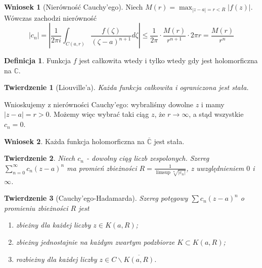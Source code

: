 \documentclass[11pt]{article}
\newcommand{\abs}[1]{\left|#1\right|} %
\newcommand{\closure}[1]{\overline{#1}} %
\newcommand{\extcomplex}{\overline{\mathbb{C}}} %
\theoremstyle{plain}
\newtheorem*{theorem}{Twierdzenie}
\theoremstyle{definition}
\newtheorem*{definition}{Definicja}
\newtheorem*{corollary}{Wniosek}
\theoremstyle{remark}
\let\oldendproof\endproof
\renewenvironment{proof}[1][\proofname]{
  \oldproof[\textsc{\small #1}]
}{\oldendproof}
\begin{document}
\begin{corollary}[Nierówność Cauchy'ego]
  Niech $ M(r) = \max_{\abs{z-a} = r < R} \abs{f(z)} $. Wówczas zachodzi nierówność
  $$ \abs{c_{n}} = \abs{ \frac{1}{2 \pi i} \int_{C(a, r)} \frac{f(\zeta)}{(\zeta-a)^{n+1}} d\zeta } \leq \frac{1}{2 \pi} \cdot \frac{M(r)}{r^{n+1}} \cdot 2 \pi r = \frac{M(r)}{r^n} $$
\end{corollary}

\begin{definition}
  Funkcja $ f $ jest całkowita wtedy i tylko wtedy gdy jest holomorficzna na $ \mathbb{C} $.
\end{definition}

\begin{theorem}[Liouville'a]
  Każda funkcja całkowita i ograniczona jest stała.
\end{theorem}

\begin{proof}
  Wnioskujemy z nierówności Cauchy'ego: wybraliśmy dowolne $ z $ i mamy $ \abs{z-a} = r > 0 $. Możemy więc wybrać taki ciąg $ z $, że $ r \to \infty $, a stąd wszystkie $ c_{n} = 0 $. 
\end{proof}

\begin{corollary}
  Każda funkcja holomorficzna na $ \extcomplex $ jest stała.
\end{corollary}

\begin{theorem}
  Niech $ c_{n} $ - dowolny ciąg liczb zespolonych. Szereg $ \sum_{n=0}^{\infty} c_{n}(z-a)^{n} $ ma promień zbieżności $ R = \frac{1}{\limsup \sqrt[n]{\abs{c_{n}}}} $, z uwzględnieniem $ 0 $ i $ \infty $.
\end{theorem}

\begin{theorem}[Cauchy'ego-Hadamarda]
  Szereg potęgowy $ \sum c_{n}(z-a)^{n} $ o promieniu zbieżności $ R $ jest 
  \begin{enumerate}
    \item zbieżny dla każdej liczby $ z \in K(a, R) $; \label{prom-zbieznosci-zbieznosc}
    \item zbieżny jednostajnie na każdym zwartym podzbiorze $ K \subset K(a, R) $; \label{prom-zbieznosci-zbieznosc-jedn}
    \item rozbieżny dla każdej liczby $ z \in C \backslash \closure{K(a, R)} $. \label{prom-zbieznosci-rozbieznosc}
  \end{enumerate}
\end{theorem}
\end{document}
